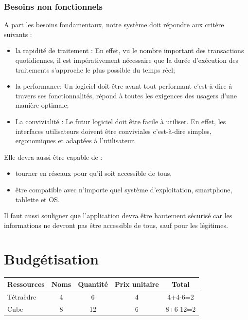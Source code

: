 		\subsubsection{Besoins non fonctionnels}
			A part les besoins fondamentaux, notre système doit répondre aux critère suivants :
				\begin{itemize}
					\item la rapidité de traitement :  En effet, vu le nombre important des transactions quotidiennes, il est impérativement nécessaire que la durée d'exécution des traitements s'approche le plus possible du temps réel;
					\item la performance: Un logiciel doit être avant tout performant c'est-à-dire à travers ses fonctionnalités, répond à toutes les exigences des usagers d'une manière optimale;
					\item La convivialité : Le futur logiciel doit être facile à utiliser. En effet, les interfaces utilisateurs doivent être conviviales c'est-à-dire simples, ergonomiques et adaptées à l'utilisateur.
				\end{itemize}
				Elle devra aussi être capable de :
				\begin{itemize}
					\item tourner en réseaux pour qu'il soit accessible de tous,
					\item être compatible avec n'importe quel système d'exploitation, smartphone, tablette et OS.
					
				\end{itemize}
				
					Il faut aussi souligner que l'application devra être hautement sécurisé car les informations ne devront pas être accessible de tous, sauf pour les légitimes.
					
	\section{ Budgétisation}
	\begin{minipage}{\textwidth}
		
			\begin{center}
			\begin{tabular}{|l|*{4}{c|}}
				\hline
					{Ressources}&Noms&Quantité&Prix unitaire &Total\\ 
				\hline
				\rowcolor{gris1}Tétraèdre&4&6&4&4+4-6=2\\ \hline
				Cube&8&12&6&\cellcolor{gris2}8+6-12=2\\ \hline	
			\end{tabular}
		\end{center}
	\end{minipage}
	
